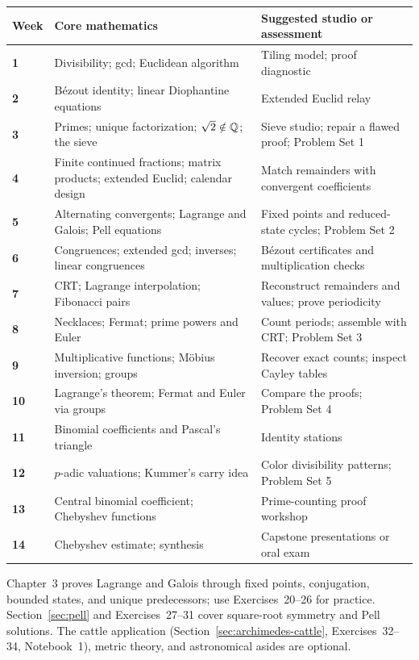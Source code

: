 \begin{center}
\small
\begin{tabularx}{\textwidth}{>{\bfseries}p{}p{}X}
\toprule
Week & Core mathematics & Suggested studio or assessment \\
\midrule
1 & Divisibility; gcd; Euclidean algorithm & Tiling model; proof diagnostic \\
2 & B\'ezout identity; linear Diophantine equations & Extended Euclid relay \\
3 & Primes; unique factorization; $\sqrt2\notin\mathbb Q$; the sieve & Sieve studio; repair a flawed proof; Problem Set 1 \\
4 & Finite continued fractions; matrix products; extended Euclid; calendar design & Match remainders with convergent coefficients \\
5 & Alternating convergents; Lagrange and Galois; Pell equations & Fixed points and reduced-state cycles; Problem Set 2 \\
6 & Congruences; extended gcd; inverses; linear congruences & B\'ezout certificates and multiplication checks \\
7 & CRT; Lagrange interpolation; Fibonacci pairs & Reconstruct remainders and values; prove periodicity \\
8 & Necklaces; Fermat; prime powers and Euler & Count periods; assemble with CRT; Problem Set 3 \\
9 & Multiplicative functions; M\"obius inversion; groups & Recover exact counts; inspect Cayley tables \\
10 & Lagrange's theorem; Fermat and Euler via groups & Compare the proofs; Problem Set 4 \\
11 & Binomial coefficients and Pascal's triangle & Identity stations \\
12 & $p$-adic valuations; Kummer's carry idea & Color divisibility patterns; Problem Set 5 \\
13 & Central binomial coefficient; Chebyshev functions & Prime-counting proof workshop \\
14 & Chebyshev estimate; synthesis & Capstone presentations or oral exam \\
\bottomrule
\end{tabularx}
\end{center}

Chapter~3 proves Lagrange and Galois through fixed points, conjugation,
bounded states, and unique predecessors; use Exercises~20--26 for practice.
Section~\ref{sec:pell} and Exercises~27--31 cover square-root symmetry
and Pell solutions. The cattle application
(Section~\ref{sec:archimedes-cattle}, Exercises~32--34, Notebook~1),
metric theory, and astronomical asides are optional.

